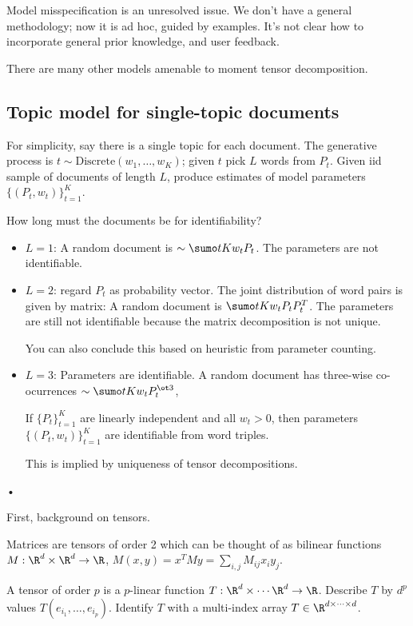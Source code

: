 Model misspecification is an unresolved issue. %
We don't have a general methodology; now it is ad hoc, guided by examples. It's not clear how to incorporate general prior knowledge, and user feedback.

There are many other models amenable to moment tensor decomposition.

\subsection{Topic model for single-topic documents}

For simplicity, say there is a single topic for each document. The generative process is $t\sim \text{Discrete}(w_1,\ldots, w_K)$; given $t$ pick $L$ words from $P_t$. Given iid sample of documents of length $L$, produce estimates of model parameters $\{(P_t,w_t)\}_{t=1}^K$. 

How long must the documents be for identifiability?

\begin{itemize}
\item
$L=1$: A random document is $\sim \sumo tK w_t P_t$. The parameters are not identifiable.
\item
$L=2$: regard $P_t$ as probability vector. The joint distribution of word pairs is given by matrix: A random document is $\sumo tK w_t P_tP_t^T$. The parameters are still not identifiable because the matrix decomposition is not unique.

You can also conclude this based on heuristic from parameter counting.
\item
$L=3$: Parameters are identifiable. A random document has three-wise co-ocurrences $\sim \sumo tK w_t P_t^{\ot 3}$,

\begin{clm}
If $\{P_t\}_{t=1}^K$ are linearly independent and all $w_t>0$, then parameters $\{(P_t,w_t)\}_{t=1}^K$ are identifiable from word triples. 
\end{clm}
This is implied by uniqueness of tensor decompositions.
\end{itemize}•

First, background on tensors. 

Matrices are tensors of order 2 which can be thought of as bilinear functions $M:\R^d\times \R^d\to \R$, $M(x,y) = x^TMy = \sum_{i,j} M_{ij}x_iy_j$.

A tensor of order $p$ is a $p$-linear function $T:\R^d \times \cdots \R^d \to \R$. Describe $T$ by $d^p$ values $T(e_{i_1},\ldots, e_{i_p})$. Identify $T$ with a multi-index array $T\in \R^{d\times \cdots \times d}$. 

